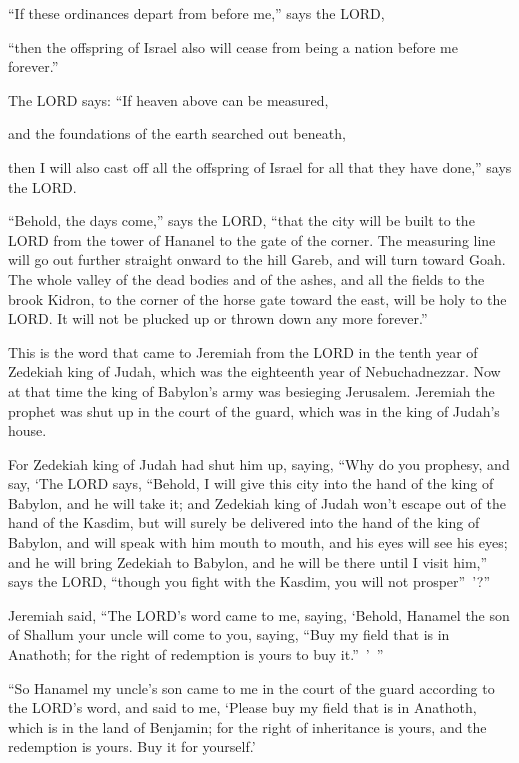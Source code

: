 \myverse{}“If these ordinances depart from before me,” says the LORD,

“then the offspring of Israel also will cease from being a nation before me forever.”


\myverse{}The LORD says: “If heaven above can be measured,

and the foundations of the earth searched out beneath,

then I will also cast off all the offspring of Israel for all that they have done,”
says the LORD.


\myverse{}“Behold, the days come,” says the LORD, “that the city will be built to the LORD from the tower of Hananel to the gate of the corner. \myverse{}The measuring line will go out further straight onward to the hill Gareb, and will turn toward Goah. \myverse{}The whole valley of the dead bodies and of the ashes, and all the fields to the brook Kidron, to the corner of the horse gate toward the east, will be holy to the LORD. It will not be plucked up or thrown down any more forever.”
			
			
\mychapter{} \myverse*{}This is the word that came to Jeremiah from the LORD in the tenth year of Zedekiah king of Judah, which was the eighteenth year of Nebuchadnezzar. \myverse{}Now at that time the king of Babylon’s army was besieging Jerusalem. Jeremiah
the prophet was shut up in the court of the guard, which was in the king of Judah’s house.


\myverse{}For Zedekiah king of Judah had shut him up, saying, “Why do you prophesy, and say, ‘The LORD says, “Behold, I will give this city into the hand of the king of Babylon, and he will take it; \myverse{}and Zedekiah king of Judah won’t escape out of the hand of the Kasdim, but will surely be delivered into the hand of the king of Babylon, and will speak with him mouth to mouth, and his eyes will see his eyes; \myverse{}and he will bring Zedekiah to Babylon, and he will be there until I visit him,” says the LORD, “though you fight with the Kasdim, you will not prosper” ’?”


\myverse{}Jeremiah said, “The LORD’s word came to me, saying, \myverse{}‘Behold, Hanamel the son of Shallum your uncle will come to you, saying, “Buy my field that is in Anathoth; for the right of redemption is yours to buy it.” ’ ”


\myverse{}“So Hanamel my uncle’s son came to me in the court of the guard according to the LORD’s word, and said to me, ‘Please buy my field that is in Anathoth, which is in the land of Benjamin; for the right of inheritance is yours, and the redemption is yours. Buy it for yourself.’

